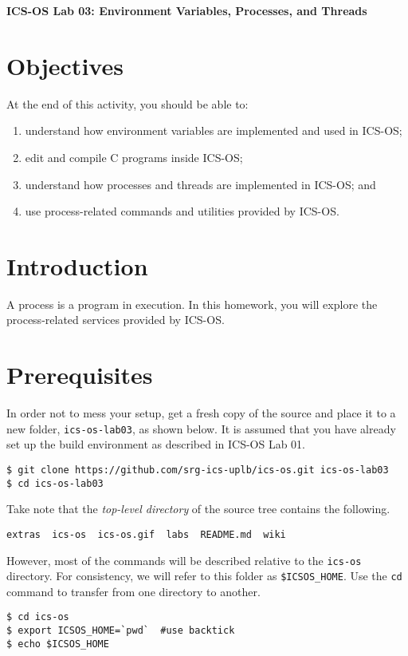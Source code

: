\documentclass[a4paper, 11pt,oneside]{article}
\begin{document}
\begin{center}
   {\LARGE \textbf{ICS-OS Lab 03: Environment Variables, Processes, and Threads}}
\end{center}

\section*{Objectives}
   At the end of this activity, you should be able to:
   \begin{enumerate}[itemsep=0pt,parsep=0pt]
       \item understand how environment variables are implemented and used in ICS-OS;
       \item edit and compile C programs inside ICS-OS;
       \item understand how processes and threads are implemented in ICS-OS; and
       \item use process-related commands and utilities provided by ICS-OS.
   \end{enumerate}   

\section{Introduction}
A process is a program in execution. In this homework, you will explore the process-related services provided by ICS-OS. 

\section{Prerequisites}
In order not to mess your setup, get a fresh copy of the source and place it to a new folder, \texttt{ics-os-lab03}, as shown below. It is assumed that you have already set up the build environment as described in ICS-OS Lab 01.

\begin{verbatim}
$ git clone https://github.com/srg-ics-uplb/ics-os.git ics-os-lab03
$ cd ics-os-lab03
\end{verbatim}

Take note that the \textit{top-level directory} of the source 
tree contains the following. 

\begin{verbatim}
extras  ics-os  ics-os.gif  labs  README.md  wiki
\end{verbatim}

However, most of the commands will be described relative to the \texttt{ics-os} directory.
For consistency, we will refer to this folder as \texttt{\$ICSOS\_HOME}. Use the \texttt{cd} 
command to transfer from one directory to another.
\begin{verbatim}
$ cd ics-os
$ export ICSOS_HOME=`pwd`  #use backtick
$ echo $ICSOS_HOME
\end{verbatim}
\end{document}
